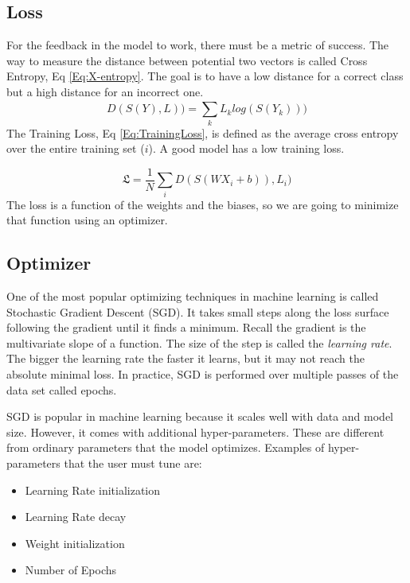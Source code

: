 \subsection{Loss}
For the feedback in the model to work, there must be a metric of success.  The way to measure the distance between potential two vectors is called Cross Entropy, Eq \ref{Eq:X-entropy}. The goal is to have a low distance for a correct class but a high distance for an incorrect one.    
\begin{equation}\label{Eq:X-entropy}
D(S(Y),L)) = \sum_{k}^{ }L_{k}log(S(Y_{k})))
\end{equation}
The Training Loss, Eq \ref{Eq:TrainingLoss}, is defined as the average cross entropy over the entire training set ($i$). A good model has a low training loss.   

\begin{equation}\label{Eq:TrainingLoss}
\mathfrak{L} = \frac{1}{N}\sum_{i}^{ }D(S(WX_{i}+b)),L_{i})
\end{equation}
The loss is a function of the weights and the biases, so we are going to minimize that function using an optimizer.\cite{Udacity} 
\subsection{Optimizer}
One of the most popular optimizing techniques in machine learning is called Stochastic Gradient Descent (SGD).  It takes small steps along the loss surface following the gradient until it finds a minimum.  Recall the gradient is the multivariate slope of a function.  The size of the step is called the \emph{learning rate}.  The bigger the learning rate the faster it learns, but it may not reach the absolute minimal loss.  In practice, SGD is performed over multiple passes of the data set called epochs.  

SGD is popular in machine learning  because it scales well with data and model size.  However, it comes with additional hyper-parameters.  These are different from ordinary parameters that the model optimizes.  Examples of hyper-parameters that the user must tune are:
\begin{itemize}
\item Learning Rate initialization
\item Learning Rate decay
\item Weight initialization
\item Number of Epochs 
\end{itemize}

